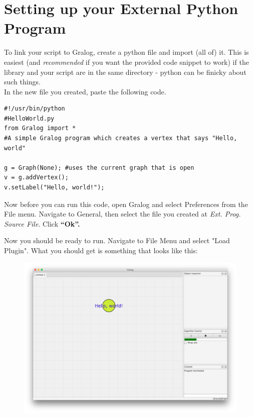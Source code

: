 \section{Setting up your External Python Program}
To link your script to Gralog, create a python file and import (all of) it. This is easiest (and \textit{recommended} if you want the provided code snippet to work) if the library and your script are in the same directory - python can be finicky about such things.\\

In the new file you created, paste the following code.


\begin{lstlisting}[title={Code Snippet 1},label=codeSnippet1]
#!/usr/bin/python
#HelloWorld.py
from Gralog import *
#A simple Gralog program which creates a vertex that says "Hello, world"

g = Graph(None); #uses the current graph that is open
v = g.addVertex();
v.setLabel("Hello, world!");
\end{lstlisting}

Now before you can run this code, open Gralog and select Preferences from the File menu. Navigate to General, then select the file you created at \emph{Ext. Prog. Source File}. Click \textbf{``Ok''.}

Now you should be ready to run. Navigate to File Menu and select "Load Plugin". What you should get is something that looks like this: 

\begin{figure}[H]
\centering
\includegraphics[width=\textwidth]{helloWorld.png}
\end{figure}


